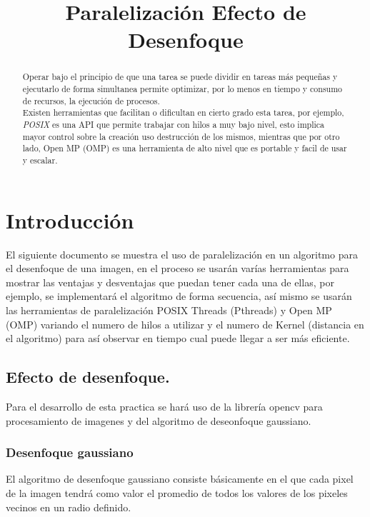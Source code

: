 \documentclass{IEEEtran}
\begin{document}
\title{Paralelización Efecto de Desenfoque}
\author{
}
\maketitle

\begin{abstract}
Operar bajo el principio de que una tarea se puede dividir en tareas más pequeñas y ejecutarlo de forma simultanea permite optimizar, por lo menos en tiempo y consumo de recursos, la ejecución de procesos.
\\

Existen herramientas que facilitan o dificultan en cierto grado esta tarea, por ejemplo, \textit{POSIX} es una API que permite trabajar con hilos a muy bajo nivel, esto implica mayor control sobre la creación uso destrucción de los mismos, mientras que por otro lado, Open MP (OMP) es una herramienta de alto nivel que es portable y facil de usar y escalar.
\end{abstract}

\section{Introducción}

El siguiente documento se muestra el uso de paralelización en un algoritmo para el desenfoque de una imagen, en el proceso se usarán varías herramientas para mostrar las ventajas y desventajas que puedan tener cada una de ellas, por ejemplo, se implementará el algoritmo de forma secuencia, así mismo se usarán las herramientas de paralelización POSIX Threads (Pthreads) y Open MP (OMP) variando el numero de hilos a utilizar y el numero de Kernel (distancia en el algoritmo) para así observar en tiempo cual puede llegar a ser más eficiente.


\subsection{Efecto de desenfoque.}
Para el desarrollo de esta practica se hará uso de la librería opencv para procesamiento de imagenes y del algoritmo de deseonfoque gaussiano.

\subsubsection{Desenfoque gaussiano}
El algoritmo de desenfoque gaussiano consiste básicamente en el que cada pixel de la imagen tendrá como valor el promedio de todos los valores de los pixeles vecinos en un radio definido.
\end{document}

